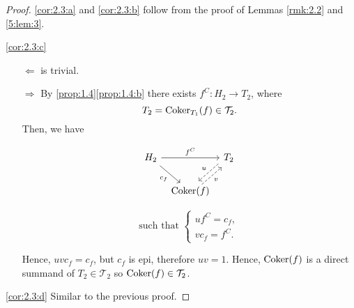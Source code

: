 \begin{proof}
  \ref{cor:2.3:a} and \ref{cor:2.3:b} follow from the proof of Lemmas \ref{rmk:2.2}
  and \ref{5:lem:3}.

  \ref{cor:2.3:c}
  \begin{enumerate}
    \item[$\Leftarrow$] is trivial.
    \item[$\Rightarrow$] By \ref{prop:1.4}\ref{prop:1.4:b} there exists $f^C:H_2\to T_2$, where
      \[T_2=\operatorname{Coker}_{T_1}(f)\in\mathcal{T}_2.\] Then, we have

\begingroup
\setlength{\abovedisplayskip}{0pt}
      \begin{minipage}[b]{0.45\linewidth}
        \begin{equation*}
          \begin{tikzcd}[column sep=tiny]
            H_2\arrow{rr}{f^C}\arrow{dr}[']{c_f}
              & & T_2 \arrow[dashed, shift right]{ld}[']{u}\\
              & \Coker(f)\arrow[dashed, shift right]{ur}[']{v}
          \end{tikzcd}
        \end{equation*}
      \end{minipage}
      \begin{minipage}[b]{0.45\linewidth}
        \begin{equation*}
          \text{such that }
          \left\{
          \begin{array}{c}
            uf^C = c_f,\\
            vc_f = f^C.
          \end{array}
          \right.
        \end{equation*}
      \end{minipage}
\endgroup

\begin{sloppypar}
      Hence, $uvc_f=c_f$, but $c_f$ is epi, therefore $uv=1$. Hence, $\operatorname{Coker}(f)$ is a direct
      summand of $T_2\in\mathcal{T}_2$ so ${\operatorname{Coker}(f)\in\mathcal{T}_2}$.
    \end{sloppypar}
  \end{enumerate}

  \ref{cor:2.3:d} Similar to the previous proof.
\end{proof}

